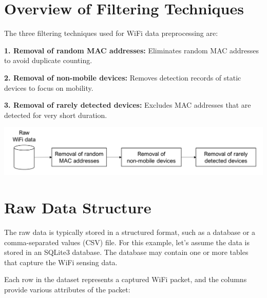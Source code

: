 \documentclass[
  letterpaper,
]{scrbook}
\begin{document}
\hypertarget{overview-of-filtering-techniques}{%
\section{Overview of Filtering
Techniques}\label{overview-of-filtering-techniques}}

The three filtering techniques used for WiFi data preprocessing are:

\textbf{1. Removal of random MAC addresses:} Eliminates random MAC
addresses to avoid duplicate counting.

\textbf{2. Removal of non-mobile devices:} Removes detection records of
static devices to focus on mobility.

\textbf{3. Removal of rarely detected devices:} Excludes MAC addresses
that are detected for very short duration.

\includegraphics{content/material/ch3/preprocessing.png}

\hypertarget{raw-data-structure}{%
\section{Raw Data Structure}\label{raw-data-structure}}

The raw data is typically stored in a structured format, such as a
database or a comma-separated values (CSV) file. For this example, let's
assume the data is stored in an SQLite3 database. The database may
contain one or more tables that capture the WiFi sensing data.

Each row in the dataset represents a captured WiFi packet, and the
columns provide various attributes of the packet:
\end{document}
